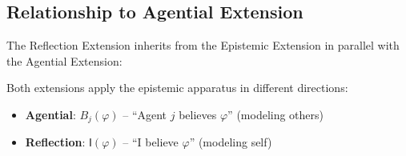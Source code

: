 \documentclass[../LogosReference.tex]{subfiles}
\begin{document}

\subsection{Relationship to Agential Extension}\label{sec:reflection-agential}

The Reflection Extension inherits from the Epistemic Extension in parallel with the Agential Extension:

\begin{center}
\end{center}

Both extensions apply the epistemic apparatus in different directions:
\begin{itemize}
\item \textbf{Agential}: $B_j(\varphi)$ -- ``Agent $j$ believes $\varphi$'' (modeling others)
\item \textbf{Reflection}: $\mathsf{I}(\varphi)$ -- ``I believe $\varphi$'' (modeling self)
\end{itemize}
\end{document}
